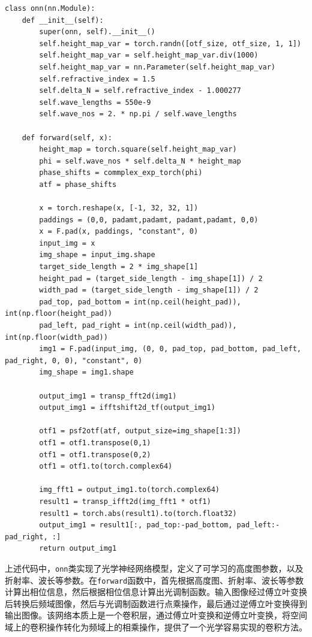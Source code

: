 \begin{lstlisting}[style=Python]
class onn(nn.Module):
    def __init__(self):
        super(onn, self).__init__()
        self.height_map_var = torch.randn([otf_size, otf_size, 1, 1])
        self.height_map_var = self.height_map_var.div(1000)
        self.height_map_var = nn.Parameter(self.height_map_var)
        self.refractive_index = 1.5
        self.delta_N = self.refractive_index - 1.000277
        self.wave_lengths = 550e-9
        self.wave_nos = 2. * np.pi / self.wave_lengths

    def forward(self, x):
        height_map = torch.square(self.height_map_var)
        phi = self.wave_nos * self.delta_N * height_map
        phase_shifts = commplex_exp_torch(phi)
        atf = phase_shifts

        x = torch.reshape(x, [-1, 32, 32, 1])
        paddings = (0,0, padamt,padamt, padamt,padamt, 0,0)
        x = F.pad(x, paddings, "constant", 0)
        input_img = x
        img_shape = input_img.shape
        target_side_length = 2 * img_shape[1]
        height_pad = (target_side_length - img_shape[1]) / 2
        width_pad = (target_side_length - img_shape[1]) / 2
        pad_top, pad_bottom = int(np.ceil(height_pad)), int(np.floor(height_pad))
        pad_left, pad_right = int(np.ceil(width_pad)), int(np.floor(width_pad))
        img1 = F.pad(input_img, (0, 0, pad_top, pad_bottom, pad_left, pad_right, 0, 0), "constant", 0)
        img_shape = img1.shape

        output_img1 = transp_fft2d(img1)
        output_img1 = ifftshift2d_tf(output_img1)

        otf1 = psf2otf(atf, output_size=img_shape[1:3])
        otf1 = otf1.transpose(0,1)
        otf1 = otf1.transpose(0,2)
        otf1 = otf1.to(torch.complex64)

        img_fft1 = output_img1.to(torch.complex64)
        result1 = transp_ifft2d(img_fft1 * otf1)
        result1 = torch.abs(result1).to(torch.float32) 
        output_img1 = result1[:, pad_top:-pad_bottom, pad_left:-pad_right, :]
        return output_img1
\end{lstlisting}

上述代码中，\texttt{onn}类实现了光学神经网络模型，定义了可学习的高度图参数，以及折射率、波长等参数。在\texttt{forward}函数中，首先根据高度图、折射率、波长等参数计算出相位信息，然后根据相位信息计算出光调制函数。输入图像经过傅立叶变换后转换后频域图像，然后与光调制函数进行点乘操作，最后通过逆傅立叶变换得到输出图像。该网络本质上是一个卷积层，通过傅立叶变换和逆傅立叶变换，将空间域上的卷积操作转化为频域上的相乘操作，提供了一个光学容易实现的卷积方法。

